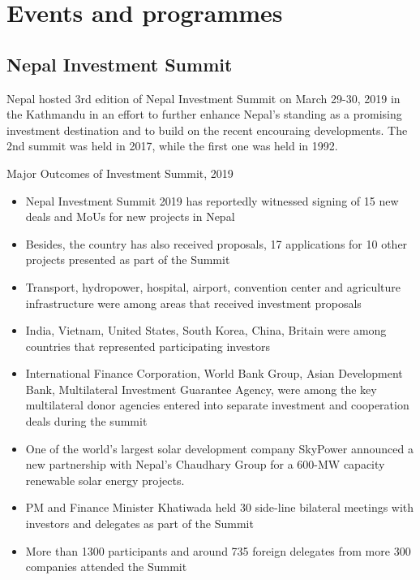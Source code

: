 \documentclass[
  openany]{book}
\providecommand{\tightlist}{%
  \setlength{\itemsep}{0pt}\setlength{\parskip}{0pt}}
\begin{document}
\hypertarget{events-and-programmes}{%
\section{Events and programmes}\label{events-and-programmes}}

\hypertarget{nepal-investment-summit}{%
\subsection{Nepal Investment Summit}\label{nepal-investment-summit}}

Nepal hosted 3rd edition of Nepal Investment Summit on March 29-30, 2019 in the Kathmandu in an effort to further enhance Nepal's standing as a promising investment destination and to build on the recent encouraing developments. The 2nd summit was held in 2017, while the first one was held in 1992.

Major Outcomes of Investment Summit, 2019

\begin{itemize}
\tightlist
\item
  Nepal Investment Summit 2019 has reportedly witnessed signing of 15 new deals and MoUs for new projects in Nepal
\item
  Besides, the country has also received proposals, 17 applications for 10 other projects presented as part of the Summit
\item
  Transport, hydropower, hospital, airport, convention center and agriculture infrastructure were among areas that received investment proposals
\item
  India, Vietnam, United States, South Korea, China, Britain were among countries that represented participating investors
\item
  International Finance Corporation, World Bank Group, Asian Development Bank, Multilateral Investment Guarantee Agency, were among the key multilateral donor agencies entered into separate investment and cooperation deals during the summit
\item
  One of the world's largest solar development company SkyPower announced a new partnership with Nepal's Chaudhary Group for a 600-MW capacity renewable solar energy projects.
\item
  PM and Finance Minister Khatiwada held 30 side-line bilateral meetings with investors and delegates as part of the Summit
\item
  More than 1300 participants and around 735 foreign delegates from more 300 companies attended the Summit
\end{itemize}
\end{document}
